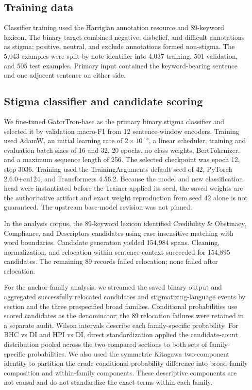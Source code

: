 \documentclass[unnumsec,webpdf,contemporary,large]{oup-authoring-template}
\begin{document}
\subsection{Training data}

Classifier training used the Harrigian annotation resource and 89-keyword lexicon. The binary target combined negative, disbelief, and difficult annotations as stigma; positive, neutral, and exclude annotations formed non-stigma. The 5,043 examples were split by note identifier into 4,037 training, 501 validation, and 505 test examples. Primary input contained the keyword-bearing sentence and one adjacent sentence on either side.

\subsection{Stigma classifier and candidate scoring}

We fine-tuned GatorTron-base as the primary binary stigma classifier and selected it by validation macro-F1 from 12 sentence-window encoders. Training used AdamW, an initial learning rate of \(2\times10^{-5}\), a linear scheduler, training and evaluation batch sizes of 16 and 32, 20 epochs, no class weights, BertTokenizer, and a maximum sequence length of 256. The selected checkpoint was epoch 12, step 3036. Training used the TrainingArguments default seed of 42, PyTorch 2.6.0+cu124, and Transformers 4.56.2. Because the model and new classification head were instantiated before the Trainer applied its seed, the saved weights are the authoritative artifact and exact weight reproduction from seed 42 alone is not guaranteed. The upstream base-model revision was not pinned.

In the analysis corpus, the 89-keyword lexicon identified Credibility \& Obstinacy, Compliance, and Descriptors candidates using case-insensitive matching with word boundaries. Candidate generation yielded 154,984 spans. Cleaning, normalization, and relocation within sentence context succeeded for 154,895 candidates. The remaining 89 records failed relocation; none failed after relocation.

For the anchor-family analysis, we streamed the saved binary output and aggregated successfully relocated candidates and stigmatizing-language events by section and the three prespecified broad families. Conditional probabilities use scored candidates as the denominator; the 89 relocation failures were retained in a separate audit. Wilson intervals describe each family-specific probability. For BHC vs DI and HPI vs DI, direct standardization applied the candidate-count distribution pooled across the two compared sections to both sets of family-specific probabilities. We also used the symmetric Kitagawa two-component identity to partition the crude conditional-probability difference into broad-family composition and within-family components. These descriptive components are not causal and do not standardize the exact terms within each family.
\end{document}
